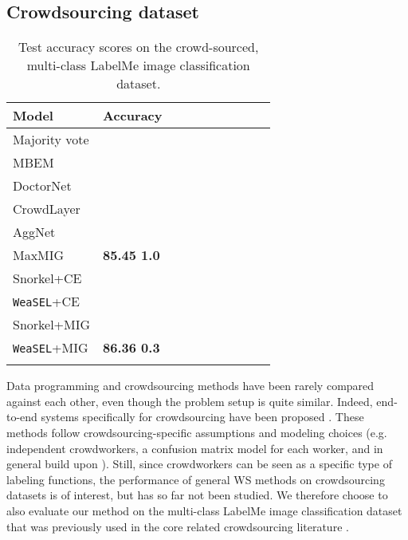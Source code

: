 \documentclass{article}
\newcommand{\weasel}{\texttt{WeaSEL}}\newcommand{\brackets}[1]{\left( #1 \right)}
\newcommand{\first}[1]{{\color{blue}\textbf{#1}}}
\newcommand{\second}[1]{{\textbf{#1}}}
\begin{document}
\subsection{Crowdsourcing dataset} \label{sec:crowdsourcing}


\begin{wraptable}{r}{6cm}
\vspace{-4mm}
\caption{Test accuracy scores on the crowd-sourced, multi-class LabelMe image classification dataset.
}
\vspace{-3mm}
\begin{center}
\begin{tabular}{llllllllll}
\toprule
    Model & Accuracy \\ 
    \midrule
        Majority vote        & \\  
        MBEM \cite{khetan2017learning} &  \\
        DoctorNet \cite{doctorNet} & \\ 
        CrowdLayer \cite{rodrigues2018deep} & \\ 
        AggNet \cite{aggNet} &  \\
        MaxMIG \cite{MaxMIG} & \second{85.45  1.0}\\ 
        Snorkel+CE & \\ 
        \weasel+CE & \\             Snorkel+MIG & \\ 
        \weasel+MIG & \first{86.36  0.3}\\     \bottomrule
    \label{tab:labelMe}
\end{tabular}
\end{center}
\vspace{-5mm}
\end{wraptable} Data programming and crowdsourcing methods have been rarely compared against each other, even though the problem setup is quite similar.
Indeed, end-to-end systems specifically for crowdsourcing have been proposed \cite{raykar10a, khetan2017learning, rodrigues2018deep, MaxMIG}. These methods follow crowdsourcing-specific assumptions and modeling choices (e.g. independent crowdworkers, a confusion matrix model for each worker, and in general build upon \cite{SkeneModel}). 
Still, since crowdworkers can be seen as a specific type of labeling functions, the performance of general WS methods on crowdsourcing datasets is of interest, but has so far not been studied. We therefore choose to also evaluate our method on the multi-class LabelMe image classification dataset that was previously used in the core related crowdsourcing literature \cite{rodrigues2018deep, MaxMIG}.
\end{document}
